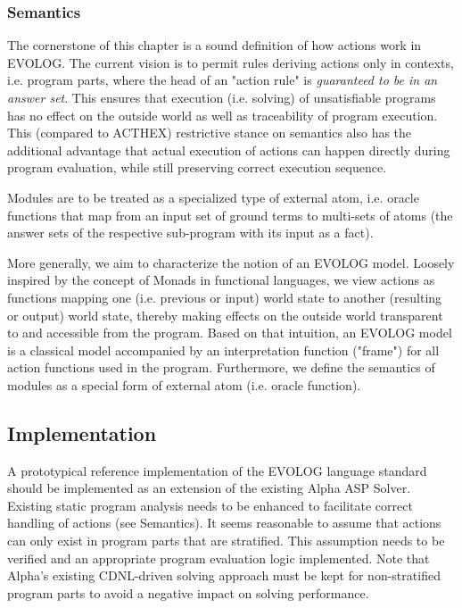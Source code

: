 \documentclass[12pt, letterpaper, twoside]{scrartcl}
\begin{document}
\subsubsection{Semantics}

The cornerstone of this chapter is a sound definition of how actions work in EVOLOG. The current vision is to permit rules deriving actions only in contexts, i.e. program parts, where the head of an "action rule" is \emph{guaranteed to be in an answer set}. This ensures that execution (i.e. solving) of unsatisfiable programs has no effect on the outside world as well as traceability of program execution. This (compared to ACTHEX) restrictive stance on semantics also has the additional advantage that actual execution of actions can happen directly during program evaluation, while still preserving correct execution sequence.

Modules are to be treated as a specialized type of external atom, i.e. oracle functions that map from an input set of ground terms to multi-sets of atoms (the answer sets of the respective sub-program with its input as a fact).

More generally, we aim to characterize the notion of an EVOLOG model. Loosely inspired by the concept of Monads in functional languages, we view actions as functions mapping one (i.e. previous or input) world state to another (resulting or output) world state, thereby making effects on the outside world transparent to and accessible from the program. Based on that intuition, an EVOLOG model is a classical model accompanied by an interpretation function ("frame") for all action functions used in the program. Furthermore, we define the semantics of modules as a special form of external atom (i.e. oracle function).

\subsection{Implementation}

A prototypical reference implementation of the EVOLOG language standard should be implemented as an extension of the existing Alpha ASP Solver.
Existing static program analysis needs to be enhanced to facilitate correct handling of actions (see Semantics). It seems reasonable to assume that actions can only exist in program parts that are stratified. This assumption needs to be verified and an appropriate program evaluation logic implemented. Note that Alpha's existing CDNL-driven solving approach must be kept for non-stratified program parts to avoid a negative impact on solving performance.
\end{document}
